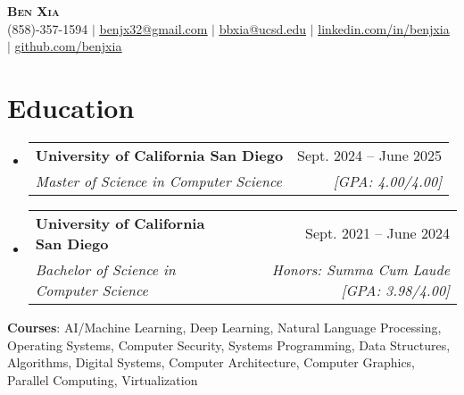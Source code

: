 \documentclass[letterpaper, 10pt]{article}
\makeatletter
\newcommand{\resumeSubheading}[4]{
  \vspace{4pt}\item
    \begin{tabular*}{0.97\textwidth}[t]{l@{\extracolsep{\fill}}r}
      \textbf{#1} & #2 \\
      \textit{#3} & \textit{\small #4} \\
    \end{tabular*}\vspace{-8pt}
}
\newcommand{\resumeSubHeadingListStart}{\begin{itemize}[leftmargin=0.15in, label={}]}
\newcommand{\resumeSubHeadingListEnd}{\end{itemize}}
\makeatother
\begin{document}

\begin{center}
  \textbf{\huge \scshape Ben Xia} \uline{} \\ \vspace{1pt}
  \small (858)-357-1594 $|$
  \href{mailto:benjx32@gmail.com}{\uline{benjx32@gmail.com}} $|$
  \href{mailto:bbxia@ucsd.edu}{\uline{bbxia@ucsd.edu}} $|$
  \href{https://linkedin.com/in/benjxia}{\uline{linkedin.com/in/benjxia}} $|$
  \href{https://github.com/benjxia}{\uline{github.com/benjxia}}
\end{center}
\vspace{-16pt}



\section{Education}
  \resumeSubHeadingListStart
  \resumeSubheading
      {University of California San Diego}{Sept. 2024 -- June 2025}
      {Master of Science in Computer Science}{[GPA: 4.00/4.00]}
  \resumeSubheading
      {University of California San Diego}{Sept. 2021 -- June 2024}
      {Bachelor of Science in Computer Science}{Honors: Summa Cum Laude [GPA: 3.98/4.00]}
  \resumeSubHeadingListEnd
  \begin{itemize}[leftmargin=0.15in, label={}]
    \small{\item{
     \textbf{Courses}{: AI/Machine Learning, Deep Learning, Natural Language Processing, Operating Systems, Computer Security, Systems Programming, Data Structures, Algorithms, Digital Systems, Computer Architecture, Computer Graphics, Parallel Computing, Virtualization } \\
    }}
 \end{itemize}

%
\end{document}
